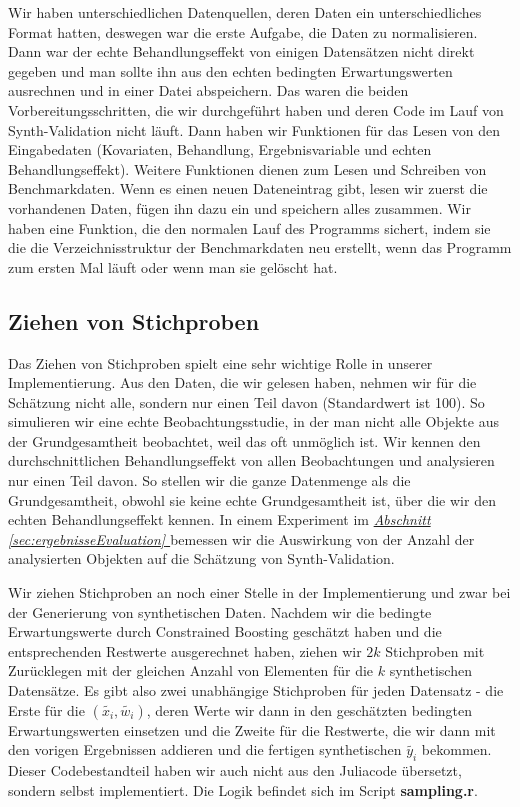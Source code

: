 \documentclass[12pt,a4paper,twoside]{scrartcl}
\numberwithin{equation}{section}
\newcommand{\refsec}[1]{\emph{\hyperref[#1]{Abschnitt \ref*{#1} }}}
\begin{document}
\noindent
Wir haben unterschiedlichen Datenquellen, deren Daten ein unterschiedliches Format hatten, deswegen war die erste Aufgabe, die Daten zu normalisieren. Dann war der echte Behandlungseffekt von einigen Datensätzen nicht direkt gegeben und man sollte ihn aus den echten bedingten Erwartungswerten ausrechnen und in einer Datei abspeichern. Das waren die beiden Vorbereitungsschritten, die wir durchgeführt haben und deren Code im Lauf von Synth-Validation nicht läuft. Dann haben wir Funktionen für das Lesen von den Eingabedaten (Kovariaten, Behandlung, Ergebnisvariable und echten Behandlungseffekt). Weitere Funktionen dienen zum Lesen und Schreiben von Benchmarkdaten. Wenn es einen neuen Dateneintrag gibt, lesen wir zuerst die vorhandenen Daten, fügen ihn dazu ein und speichern alles zusammen. Wir haben eine Funktion, die den normalen Lauf des Programms sichert, indem sie die die Verzeichnisstruktur der Benchmarkdaten neu erstellt, wenn das Programm zum ersten Mal läuft oder wenn man sie gelöscht hat.\par

\subsection{Ziehen von Stichproben}\label{subsec:ziehenStichproben}
Das Ziehen von Stichproben spielt eine sehr wichtige Rolle in unserer Implementierung. Aus den Daten, die wir gelesen haben, nehmen wir für die Schätzung nicht alle, sondern nur einen Teil davon (Standardwert ist 100). So simulieren wir eine echte Beobachtungsstudie, in der man nicht alle Objekte aus der Grundgesamtheit beobachtet, weil das oft unmöglich ist. Wir kennen den durchschnittlichen Behandlungseffekt von allen Beobachtungen und analysieren nur einen Teil davon. So stellen wir die ganze Datenmenge als die Grundgesamtheit, obwohl sie keine echte Grundgesamtheit ist, über die wir den echten Behandlungseffekt kennen. In einem Experiment im \refsec{sec:ergebnisseEvaluation} bemessen wir die Auswirkung von der Anzahl der analysierten Objekten auf die Schätzung von Synth-Validation.\par

\noindent
Wir ziehen Stichproben an noch einer Stelle in der Implementierung und zwar bei der Generierung von synthetischen Daten. Nachdem wir die bedingte Erwartungswerte durch Constrained Boosting geschätzt haben und die entsprechenden Restwerte ausgerechnet haben, ziehen wir $2k$ Stichproben mit Zurücklegen mit der gleichen Anzahl von Elementen für die $k$ synthetischen Datensätze. Es gibt also zwei unabhängige Stichproben für jeden Datensatz - die Erste für die $(\tilde{x_i},\tilde{w_i})$, deren Werte wir dann in den geschätzten bedingten Erwartungswerten einsetzen und die Zweite für die Restwerte, die wir dann mit den vorigen Ergebnissen addieren und die fertigen synthetischen $\tilde{y_i}$ bekommen. Dieser Codebestandteil haben wir auch nicht aus den Juliacode übersetzt, sondern selbst implementiert. Die Logik befindet sich im Script \textbf{sampling.r}.
\end{document}
